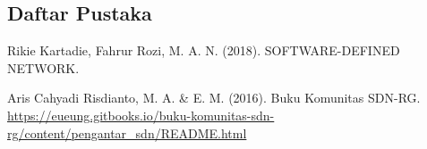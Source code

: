 \begin{center}
\section{Daftar Pustaka}
\end{center}
Rikie Kartadie, Fahrur Rozi, M. A. N. (2018). SOFTWARE-DEFINED NETWORK.

Aris Cahyadi Risdianto, M. A. \& E. M. (2016). Buku Komunitas SDN-RG.
\url{https://eueung.gitbooks.io/buku-komunitas-sdn-rg/content/pengantar_sdn/README.html}
